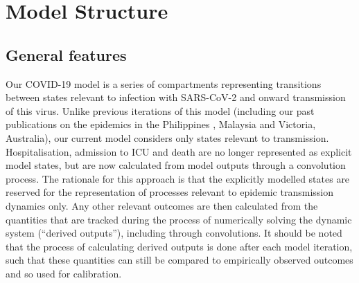 
\section{Model Structure}

\subsection{General features}

Our COVID-19 model is a series of compartments representing transitions between states relevant to infection with SARS-CoV-2 and onward transmission of this virus.
Unlike previous iterations of this model (including our past publications on the epidemics in the Philippines \cite{caldwell-2021-a}, Malaysia \cite{jayasundara-2021} and Victoria, Australia), our current model considers only states relevant to transmission.
Hospitalisation, admission to ICU and death are no longer represented as explicit model states, but are now calculated from model outputs through a convolution process.
The rationale for this approach is that the explicitly modelled states are reserved for the representation of processes relevant to epidemic transmission dynamics only.
Any other relevant outcomes are then calculated from the quantities that are tracked during the process of numerically solving the dynamic system (``derived outputs''), including through convolutions.
It should be noted that the process of calculating derived outputs is done after each model iteration, such that these quantities can still be compared to empirically observed outcomes and so used for calibration.

